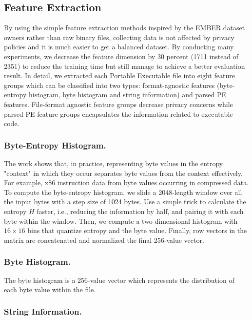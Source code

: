 \documentclass[runningheads]{llncs}
\begin{document}
\subsection{Feature Extraction}

By using the simple feature extraction methods inspired by the EMBER dataset owners rather than raw binary files, collecting data is not affected by privacy policies and it is much easier to get a balanced dataset. By conducting many experiments, we decrease the feature dimension by 30 percent (1711 instead of 2351) to reduce the training time but still manage to achieve a better evaluation result. In detail, we extracted each Portable Executable file into eight feature groups which can be classified into two types: format-agnostic features (byte-entropy histogram, byte histogram and string information) and parsed PE features. File-format agnostic feature groups decrease privacy concerns while parsed PE feature groups encapsulates the information related to executable code.

\subsubsection{Byte-Entropy Histogram.}

The work \cite{saxe2015deep} shows that, in practice, representing byte values in the entropy "context" in which they occur separates byte values from the context effectively. For example, x86 instruction data from byte values occurring in compressed data. To compute the byte-entropy histogram, we slide a 2048-length window over all the input bytes with a step size of 1024 bytes. Use a simple trick to calculate the entropy $H$ faster, i.e., reducing the information by half, and pairing it with each byte within the window. Then, we compute a two-dimensional histogram with $16 \times 16$ bins that quantize entropy and the byte value. Finally, row vectors in the matrix are concatenated and normalized the final 256-value vector.

\subsubsection{Byte Histogram.}

The byte histogram is a 256-value vector which represents the distribution of each byte value within the file.

\subsubsection{String Information.}
\end{document}
